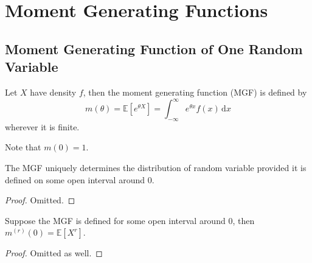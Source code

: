 \section{Moment Generating Functions}
\subsection{Moment Generating Function of One Random Variable}
\begin{definition}
    Let $X$ have density $f$, then the moment generating function (MGF) is defined by
    $$m(\theta)=\mathbb E[e^{\theta X}]=\int_{-\infty}^\infty e^{\theta x}f(x)\,\mathrm dx$$
    wherever it is finite.
\end{definition}
Note that $m(0)=1$.
\begin{theorem}
    The MGF uniquely determines the distribution of random variable provided it is defined on some open interval around $0$.
\end{theorem}
\begin{proof}
    Omitted.
\end{proof}
\begin{theorem}
    Suppose the MGF is defined for some open interval around $0$, then $m^{(r)}(0)=\mathbb E[X^r]$.
\end{theorem}
\begin{proof}
    Omitted as well.
\end{proof}

